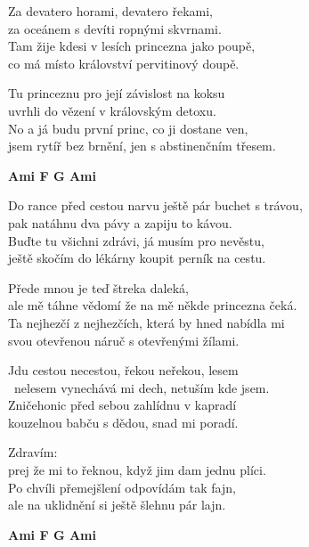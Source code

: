 
\ve{}
Za devatero horami, devatero řekami,\\
za oceánem s devíti ropnými skvrnami.\\
Tam žije kdesi v lesích princezna jako poupě,\\
co má místo království pervitinový doupě. 

\ve{}
Tu princeznu pro její závislost na koksu\\
uvrhli do vězení v královským detoxu.\\
No a já budu první princ, co ji dostane ven,\\
jsem rytíř bez brnění, jen s abstinenčním třesem.

\begin{footnotesize}
\textbf{Ami F G Ami}
\end{footnotesize}

\ve{}
Do rance před cestou narvu ještě pár buchet s trávou,\\
pak natáhnu dva pávy a zapiju to kávou.\\
Buďte tu všichni zdrávi, já musím pro nevěstu,\\
ještě skočím do lékárny koupit perník na cestu.

\cho{}
Přede mnou je teď štreka daleká,\\
ale mě táhne vědomí že na mě někde princezna čeká.\\
Ta nejhezčí z nejhezčích, která by hned nabídla mi\\
svou otevřenou náruč s otevřenými žílami.

\ve{}
Jdu cestou necestou, řekou neřekou, lesem\\\
nelesem vynechává mi dech, netuším kde jsem.\\
Zničehonic před sebou zahlídnu v kapradí\\
kouzelnou babču s dědou, snad mi poradí.

\ve{}
Zdravím: \\
prej že mi to řeknou, když jim dam jednu plíci.\\
Po chvíli přemejšlení odpovídám tak fajn,\\
ale na uklidnění si ještě šlehnu pár lajn.

\begin{footnotesize}
\textbf{Ami F G Ami}
\end{footnotesize}

